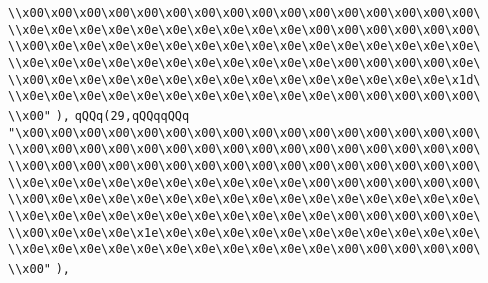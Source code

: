 \verb|\\x00\x00\x00\x00\x00\x00\x00\x00\x00\x00\x00\x00\x00\x00\x00\x00\|\newline
\verb|\\x0e\x0e\x0e\x0e\x0e\x0e\x0e\x0e\x0e\x0e\x00\x00\x00\x00\x00\x00\|\newline
\verb|\\x00\x0e\x0e\x0e\x0e\x0e\x0e\x0e\x0e\x0e\x0e\x0e\x0e\x0e\x0e\x0e\|\newline
\verb|\\x0e\x0e\x0e\x0e\x0e\x0e\x0e\x0e\x0e\x0e\x0e\x00\x00\x00\x00\x0e\|\newline
\verb|\\x00\x0e\x0e\x0e\x0e\x0e\x0e\x0e\x0e\x0e\x0e\x0e\x0e\x0e\x0e\x1d\|\newline
\verb|\\x0e\x0e\x0e\x0e\x0e\x0e\x0e\x0e\x0e\x0e\x0e\x00\x00\x00\x00\x00\|\newline
\verb|\\x00"|\newline
\verb|),|\newline
\verb|qQQq(29,qQQqqQQq|\newline
\verb|"\x00\x00\x00\x00\x00\x00\x00\x00\x00\x00\x00\x00\x00\x00\x00\x00\|\newline
\verb|\\x00\x00\x00\x00\x00\x00\x00\x00\x00\x00\x00\x00\x00\x00\x00\x00\|\newline
\verb|\\x00\x00\x00\x00\x00\x00\x00\x00\x00\x00\x00\x00\x00\x00\x00\x00\|\newline
\verb|\\x0e\x0e\x0e\x0e\x0e\x0e\x0e\x0e\x0e\x0e\x00\x00\x00\x00\x00\x00\|\newline
\verb|\\x00\x0e\x0e\x0e\x0e\x0e\x0e\x0e\x0e\x0e\x0e\x0e\x0e\x0e\x0e\x0e\|\newline
\verb|\\x0e\x0e\x0e\x0e\x0e\x0e\x0e\x0e\x0e\x0e\x0e\x00\x00\x00\x00\x0e\|\newline
\verb|\\x00\x0e\x0e\x0e\x1e\x0e\x0e\x0e\x0e\x0e\x0e\x0e\x0e\x0e\x0e\x0e\|\newline
\verb|\\x0e\x0e\x0e\x0e\x0e\x0e\x0e\x0e\x0e\x0e\x0e\x00\x00\x00\x00\x00\|\newline
\verb|\\x00"|\newline
\verb|),|\newline
